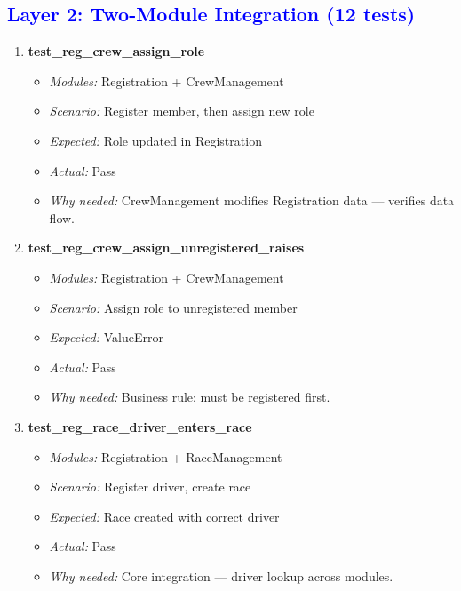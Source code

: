 \documentclass{article}
\begin{document}
\subsection*{\textcolor{blue}{Layer 2: Two-Module Integration (12 tests)}}

\begin{enumerate}[resume, label=\textbf{TC\arabic*.}]

\item \textbf{test\_reg\_crew\_assign\_role}
\begin{itemize}[noitemsep]
  \item \textit{Modules:} Registration + CrewManagement
  \item \textit{Scenario:} Register member, then assign new role
  \item \textit{Expected:} Role updated in Registration
  \item \textit{Actual:} Pass
  \item \textit{Why needed:} CrewManagement modifies Registration data — verifies data flow.
\end{itemize}

\item \textbf{test\_reg\_crew\_assign\_unregistered\_raises}
\begin{itemize}[noitemsep]
  \item \textit{Modules:} Registration + CrewManagement
  \item \textit{Scenario:} Assign role to unregistered member
  \item \textit{Expected:} ValueError
  \item \textit{Actual:} Pass
  \item \textit{Why needed:} Business rule: must be registered first.
\end{itemize}

\item \textbf{test\_reg\_race\_driver\_enters\_race}
\begin{itemize}[noitemsep]
  \item \textit{Modules:} Registration + RaceManagement
  \item \textit{Scenario:} Register driver, create race
  \item \textit{Expected:} Race created with correct driver
  \item \textit{Actual:} Pass
  \item \textit{Why needed:} Core integration — driver lookup across modules.
\end{itemize}


\end{enumerate}
\end{document}
